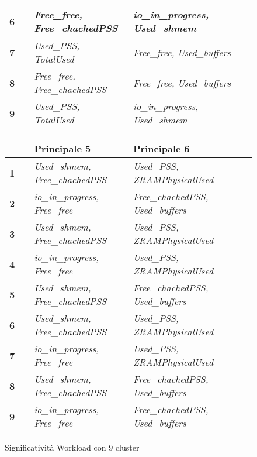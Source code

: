 \begin{figure}
\begin{tabular}{p{0.1\linewidth} || p{0.4\linewidth} | p{0.55\linewidth}}
    \hline
    \textbf{6} & \textit{Free\_free, Free\_chachedPSS} & \textit{io\_in\_progress, Used\_shmem} \\
    \hline
    \textbf{7} & \textit{Used\_PSS, TotalUsed\_}  & \textit{Free\_free, Used\_buffers} \\
    \hline
    \textbf{8} & \textit{Free\_free, Free\_chachedPSS} & \textit{Free\_free, Used\_buffers} \\
    \hline
    \textbf{9} & \textit{Used\_PSS, TotalUsed\_} & \textit{io\_in\_progress, Used\_shmem} \\
    \hline
  \end{tabular}
  \begin{tabular}{p{0.1\linewidth} || p{0.4\linewidth} | p{0.55\linewidth}}
    & \textbf{Principale 5} & \textbf{Principale 6}  \\
   \hline
   \hline
   \textbf{1} & \textit{Used\_shmem, Free\_chachedPSS} & \textit{Used\_PSS, ZRAMPhysicalUsed} \\
   \hline
   \textbf{2} & \textit{io\_in\_progress, Free\_free} & \textit{Free\_chachedPSS, Used\_buffers} \\
   \hline
   \textbf{3} & \textit{Used\_shmem, Free\_chachedPSS} & \textit{Used\_PSS, ZRAMPhysicalUsed} \\
   \hline
   \textbf{4} & \textit{io\_in\_progress, Free\_free} & \textit{Used\_PSS, ZRAMPhysicalUsed} \\
   \hline
   \textbf{5} & \textit{Used\_shmem, Free\_chachedPSS} & \textit{Free\_chachedPSS, Used\_buffers} \\
   \hline
   \textbf{6} & \textit{Used\_shmem, Free\_chachedPSS} & \textit{Used\_PSS, ZRAMPhysicalUsed} \\
   \hline
   \textbf{7} & \textit{io\_in\_progress, Free\_free} & \textit{Used\_PSS, ZRAMPhysicalUsed} \\
   \hline
   \textbf{8} & \textit{Used\_shmem, Free\_chachedPSS} & \textit{Free\_chachedPSS, Used\_buffers} \\
   \hline
   \textbf{9} & \textit{io\_in\_progress, Free\_free} & \textit{Free\_chachedPSS, Used\_buffers} \\
   \hline
  \end{tabular}
  \caption{Significatività Workload con 9 cluster}
  \end{figure}

